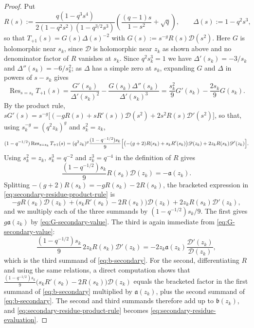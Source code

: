 \documentclass[a4paper,reqno]{amsart}
\numberwithin{equation}{section}
\theoremstyle{remark}
\theoremstyle{definition}
\begin{document}
\begin{proof}
Put
$$
R(s):=\frac{q(1-q^3s^4)}{2(1-q^2s^2)(1-q^{3/2}s^3)}
\left(\frac{(q-1)s}{1-s^2}+\sqrt q\right),
\qquad
\Delta(s):=1-q^2s^3,
$$
so that $T_{+1}(s)=G(s)\Delta(s)^{-2}$ with
$G(s):=s^{-g}R(s)\mathscr D(s^2)$.  Here $G$ is holomorphic near $s_k$,
since $\mathscr D$ is holomorphic near $z_k$ as shown above and no
denominator factor of $R$ vanishes at $s_k$.  Since $q^2s_k^3=1$ we have $\Delta'(s_k)=-3/s_k$ and
$\Delta''(s_k)=-6/s_k^2$; as $\Delta$ has a simple zero at $s_k$, expanding
$G$ and $\Delta$ in powers of $s-s_k$ gives
$$
\operatorname{Res}_{s=s_k}T_{+1}(s)
=\frac{G'(s_k)}{\Delta'(s_k)^2}
-\frac{G(s_k)\Delta''(s_k)}{\Delta'(s_k)^3}
=\frac{s_k^2}{9}G'(s_k)-\frac{2s_k}{9}G(s_k).
$$
By the product rule,
$sG'(s)=s^{-g}\bigl[(-gR(s)+sR'(s))\mathscr D(s^2)
+2s^2R(s)\mathscr D'(s^2)\bigr]$, so that, using
$s_k^{-g}=(q^2z_k)^g$ and $s_k^2=z_k$,
\begin{equation}\label{eq:secondary-residue-product-rule}
(1-q^{-1/2})\operatorname{Res}_{s=s_k}T_{+1}(s)
=(q^2z_k)^g\frac{(1-q^{-1/2})s_k}{9}
\Bigl[\bigl(-(g+2)R(s_k)+s_kR'(s_k)\bigr)\mathscr D(z_k)
+2z_kR(s_k)\mathscr D'(z_k)\Bigr].
\end{equation}
Using $s_k^2=z_k$, $s_k^3=q^{-2}$ and $z_k^3=q^{-4}$ in the definition of
$R$ gives
\begin{equation}\label{eq:G-secondary-value}
\frac{(1-q^{-1/2})s_k}{9}R(s_k)\mathscr D(z_k)=-\mathfrak a(z_k).
\end{equation}
Splitting $-(g+2)R(s_k)=-gR(s_k)-2R(s_k)$, the bracketed expression
in \eqref{eq:secondary-residue-product-rule} is
$$
-gR(s_k)\mathscr D(z_k)
+\bigl(s_kR'(s_k)-2R(s_k)\bigr)\mathscr D(z_k)
+2z_kR(s_k)\mathscr D'(z_k),
$$
and we multiply each of the three summands by $(1-q^{-1/2})s_k/9$. The first
gives $g\mathfrak a(z_k)$ by \eqref{eq:G-secondary-value}. The third is
again immediate from \eqref{eq:G-secondary-value}:
$$
\frac{(1-q^{-1/2})s_k}{9}\,2z_kR(s_k)\mathscr D'(z_k)
=-2z_k\mathfrak a(z_k)\frac{\mathscr D'(z_k)}{\mathscr D(z_k)},
$$
which is the third summand of \eqref{eq:b-secondary}. For the second,
differentiating $R$ and using the same relations, a direct computation
shows that
$\frac{(1-q^{-1/2})s_k}{9}\bigl(s_kR'(s_k)-2R(s_k)\bigr)\mathscr D(z_k)$
equals the bracketed factor in the first summand of \eqref{eq:b-secondary}
multiplied by $\mathfrak a(z_k)$, plus the second summand of
\eqref{eq:b-secondary}. The second and third summands therefore add up to
$\mathfrak b(z_k)$, and \eqref{eq:secondary-residue-product-rule} becomes
\eqref{eq:secondary-residue-evaluation}.
\end{proof}
\end{document}
